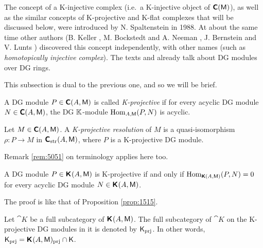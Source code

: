 \begin{rem} \label{rem:5055}
The concept of a K-injective complex (i.e.\ a K-injective object of 
$\boldsymbol{\mathsf{C}}(\operatorname{\mathsf{M}})$), as well as the similar concepts of K-projective and 
K-flat complexes that will be discussed below, were introduced by N. 
Spaltenstein \cite{Spa} in 1988. At about the same time other authors (B. Keller 
\cite{Kel1}, M. Bockstedt and A. Neeman \cite{BoNe}, J. Bernstein and V. 
Lunts \cite{BeLu}) discovered this concept 
independently, with other names (such as {\em homotopically injective complex}).
The texts \cite{BeLu} and \cite{Kel1} already talk about DG modules over DG 
rings. 
\end{rem}






 \label{subsec:K-proj}

This subsection is dual to the previous one, and so we will be brief. 

\begin{dfn} \label{dfn:1520}
A DG module $P \in \boldsymbol{\mathsf{C}}(A, \operatorname{\mathsf{M}})$ is called 
{\em K-projective}%
if for every acyclic DG module $N \in \boldsymbol{\mathsf{C}}(A, \operatorname{\mathsf{M}})$, the DG $\mathbb{K}$-module 
$\operatorname{Hom}_{A, \operatorname{\mathsf{M}}}(P, N)$ is acyclic.
\end{dfn}

\begin{dfn} \label{dfn:1521}
Let $M \in \boldsymbol{\mathsf{C}}(A, \operatorname{\mathsf{M}})$. A 
{\em K-projective resolution}%
of $M$ is a quasi-isomorphism 
$\rho : P \to M$ in $\boldsymbol{\mathsf{C}}_{\mathrm{str}}(A, \operatorname{\mathsf{M}})$, where 
$P$ is a K-projective DG module. 
\end{dfn}

Remark \ref{rem:5051} on terminology applies here too. 

\begin{prop} \label{prop:1520}
A DG module $P \in \boldsymbol{\mathsf{K}}^{}(A, \operatorname{\mathsf{M}})$ is K-projective if and only if 
$\operatorname{Hom}_{\boldsymbol{\mathsf{K}}(A, \operatorname{\mathsf{M}})}(P, N) = 0$ for every acyclic DG module 
$N \in \boldsymbol{\mathsf{K}}^{}(A, \operatorname{\mathsf{M}})$.
\end{prop}

The proof is like that of Proposition \ref{prop:1515}.



\begin{dfn} \label{dfn:1522}
Let $\cat{K}$ be a full subcategory of $\boldsymbol{\mathsf{K}}^{}(A, \operatorname{\mathsf{M}})$. 
The full subcategory of  $\cat{K}$ on the K-projective DG modules in it is 
denoted by $\operatorname{\mathsf{K}}_{\mathrm{prj}}$. In other words, 
$\operatorname{\mathsf{K}}_{\mathrm{prj}} = \boldsymbol{\mathsf{K}}^{}(A, \operatorname{\mathsf{M}})_{\mathrm{prj}} \cap \operatorname{\mathsf{K}}$.
\end{dfn}

